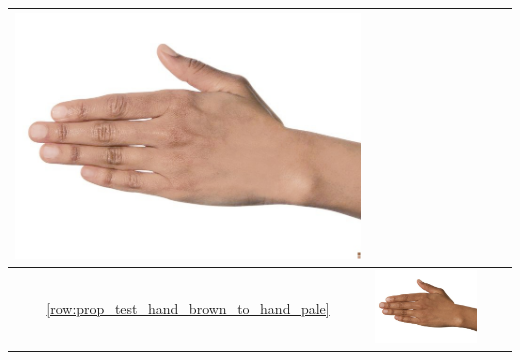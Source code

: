\begin{longtable}{|c||c|c|c|}
\begin{minipage}{.29\textwidth}
    \includegraphics[width=\textwidth,height=\textheight,keepaspectratio]{../rc_test/outputs/20170516_proportional_test/hand_brown_to_hand_light.jpg}
  \end{minipage} \\
  \hline  \ref{row:prop_test_hand_brown_to_hand_pale} &
  \begin{minipage}{.29\textwidth}
    \includegraphics[width=\textwidth,height=\textheight,keepaspectratio]{../inputs/hand_brown.jpg}
  \end{minipage} & 
  \begin{minipage}{.29\textwidth}

\end{minipage}
\end{longtable}
